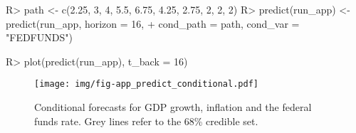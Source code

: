 \documentclass[article,nojss]{jss} %
\begin{document}
\begin{appendix}
\begin{Schunk}
\begin{Sinput}
R> path <- c(2.25, 3, 4, 5.5, 6.75, 4.25, 2.75, 2, 2, 2)
R> predict(run_app) <- predict(run_app, horizon = 16,
+    cond_path = path, cond_var = "FEDFUNDS")
\end{Sinput}
\end{Schunk}
\begin{Schunk}
\begin{Sinput}
R> plot(predict(run_app), t_back = 16)
\end{Sinput}
\end{Schunk}

\begin{figure}[ht]
	\centering
  \texttt{[image: img/fig-app\_predict\_conditional.pdf]}
	\caption{Conditional forecasts for GDP growth, inflation and the federal funds rate. Grey lines refer to the 68\% credible set.}
	\label{fig:app_predict_conditional}
\end{figure}

\clearpage


\end{appendix}

\end{document}
